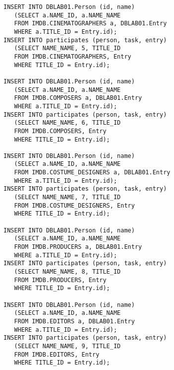 \documentclass[11pt,a4paper,DIV=9]{scrartcl}
\begin{document}
\begin{lstlisting}
INSERT INTO DBLAB01.Person (id, name)
   (SELECT a.NAME_ID, a.NAME_NAME
   FROM IMDB.CINEMATOGRAPHERS a, DBLAB01.Entry
   WHERE a.TITLE_ID = Entry.id);
INSERT INTO participates (person, task, entry)
   (SELECT NAME_NAME, 5, TITLE_ID
   FROM IMDB.CINEMATOGRAPHERS, Entry
   WHERE TITLE_ID = Entry.id);

INSERT INTO DBLAB01.Person (id, name)
   (SELECT a.NAME_ID, a.NAME_NAME
   FROM IMDB.COMPOSERS a, DBLAB01.Entry
   WHERE a.TITLE_ID = Entry.id);
INSERT INTO participates (person, task, entry) 
   (SELECT NAME_NAME, 6, TITLE_ID
   FROM IMDB.COMPOSERS, Entry
   WHERE TITLE_ID = Entry.id);

INSERT INTO DBLAB01.Person (id, name)
   (SELECT a.NAME_ID, a.NAME_NAME
   FROM IMDB.COSTUME_DESIGNERS a, DBLAB01.Entry
   WHERE a.TITLE_ID = Entry.id);
INSERT INTO participates (person, task, entry)
   (SELECT NAME_NAME, 7, TITLE_ID
   FROM IMDB.COSTUME_DESIGNERS, Entry
   WHERE TITLE_ID = Entry.id);

INSERT INTO DBLAB01.Person (id, name)
   (SELECT a.NAME_ID, a.NAME_NAME
   FROM IMDB.PRODUCERS a, DBLAB01.Entry
   WHERE a.TITLE_ID = Entry.id);
INSERT INTO participates (person, task, entry)
   (SELECT NAME_NAME, 8, TITLE_ID
   FROM IMDB.PRODUCERS, Entry
   WHERE TITLE_ID = Entry.id);

INSERT INTO DBLAB01.Person (id, name)
   (SELECT a.NAME_ID, a.NAME_NAME
   FROM IMDB.EDITORS a, DBLAB01.Entry
   WHERE a.TITLE_ID = Entry.id);
INSERT INTO participates (person, task, entry)
   (SELECT NAME_NAME, 9, TITLE_ID
   FROM IMDB.EDITORS, Entry
   WHERE TITLE_ID = Entry.id);
\end{lstlisting}
\end{document}
